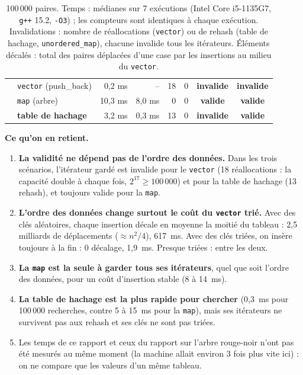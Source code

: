 \documentclass[11pt,a4paper]{article}
\newcommand{\oui}{\textcolor{vert}{\textbf{valide}}}
\newcommand{\non}{\textcolor{rouge}{\textbf{invalide}}}
\begin{document}
\begin{table}[H]
\begin{tabular}{|l|l|r|r|r|r|c|c|}
  & \texttt{vector} (push\_back) & 0,2 ms   & --      & 18 & 0               & \non & \non \\
  & \texttt{map} (arbre)     & 10,3 ms  & 8,0 ms  & 0  & 0               & \oui & \oui \\
  & \textbf{table de hachage} & 3,2 ms   & 0,3 ms  & 13 & 0               & \non & \oui \\
\hline
\end{tabular}
\caption{100\,000 paires. Temps : médianes sur 7 exécutions (Intel Core i5-1135G7,
\texttt{g++} 15.2, \texttt{-O3}) ; les compteurs sont identiques à chaque exécution.
\og Invalidations \fg{} : nombre de réallocations (\texttt{vector}) ou de rehash
(table de hachage, \texttt{unordered\_map}), chacune invalide tous les itérateurs. \og Éléments décalés \fg{} : total des paires déplacées d'une case par les insertions au
milieu du \texttt{vector}.}
\end{table}

\textbf{Ce qu'on en retient.}
\begin{enumerate}
  \item \textbf{La validité ne dépend pas de l'ordre des données.} Dans les trois scénarios,
        l'itérateur gardé est invalide pour le \texttt{vector} (18 réallocations : la
        capacité double à chaque fois, $2^{17} \geq 100\,000$) et pour
        la table de hachage (13 rehash), et toujours valide pour la \texttt{map}.
  \item \textbf{L'ordre des données change surtout le coût du \texttt{vector} trié.} Avec
        des clés aléatoires, chaque insertion décale en moyenne la moitié du tableau :
        2,5 milliards de déplacements ($\approx n^2/4$), 617~ms. Avec des clés triées, on
        insère toujours à la fin : 0 décalage, 1,9~ms. Presque triées : entre les deux.
  \item \textbf{La \texttt{map} est la seule à garder tous ses itérateurs}, quel que soit
        l'ordre des données, pour un coût d'insertion stable (8 à 14~ms).
  \item \textbf{La table de hachage est la plus rapide pour chercher} (0,3~ms pour
        100\,000 recherches, contre 5 à 15~ms pour la \texttt{map}), mais ses itérateurs ne
        survivent pas aux rehash et ses clés ne sont pas triées.
  \item Les temps de ce rapport et ceux du rapport sur l'arbre rouge-noir n'ont pas été
        mesurés au même moment (la machine allait environ 3 fois plus vite ici) : on ne
        compare que les valeurs d'un même tableau.
\end{enumerate}
\end{document}
